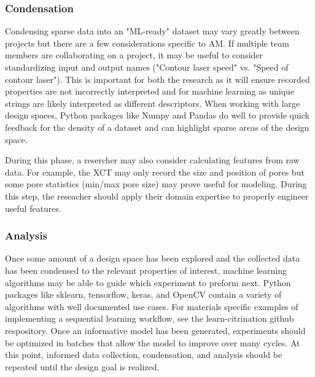 \subsubsection{Condensation}
Condensing sparse data into an "ML-ready" dataset may vary greatly between projects but there are a few considerations specific to AM.
If multiple team members are collaborating on a project, it may be useful to consider standardizing input and output names ("Contour laser speed" vs. "Speed of contour laser").
This is important for both the research as it will ensure recorded properties are not incorrectly interpreted and for machine learning as unique strings are likely interpreted as different descriptors.
When working with large design spaces, Python packages like Numpy and Pandas do well to provide quick feedback for the density of a dataset and can highlight sparse areas of the design space.

During this phase, a resercher may also consider calculating features from raw data.
For example, the XCT may only record the size and position of pores but some pore statistics (min/max pore size) may prove useful for modeling.
During this step, the reseacher should apply their domain expertise to properly engineer useful features.

\subsubsection{Analysis}
Once some amount of a design space has been explored and the collected data has been condensed to the relevant properties of interest, machine learning algorithms may be able to guide which experiment to preform next.
Python packages like sklearn, tensorflow, keras, and OpenCV contain a variety of algorithms with well documented use cases.
For materials specific examples of implementing a sequential learning workflow, see the learn-citrination github respository.
Once an informative model has been generated, experiments should be optimized in batches that allow the model to improve over many cycles.
At this point, informed data collection, condensation, and analysis should be repeated until the design goal is realized.



